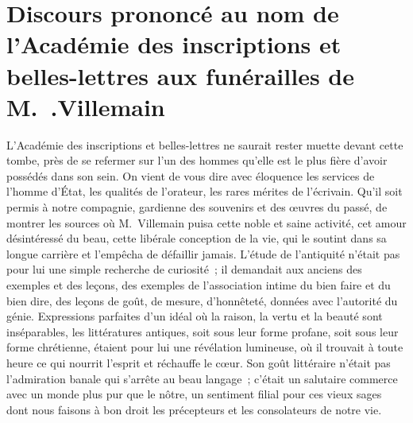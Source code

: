 \documentclass[french,twoside]{book} %
\newcommand\orgName[1]{#1}
\newcommand\persName[1]{#1}
\newcommand{\dateline}[1]{\medskip{\RaggedLeft{#1}\par}\bigskip}
\newcommand{\salute}[1]{\bigbreak{#1}\par\medbreak}
\begin{document}
\section[{Discours prononcé au nom de l’Académie des inscriptions et belles-lettres aux funérailles de M. .Villemain}]{Discours prononcé au nom de l’{\orgName Académie des inscriptions et belles-lettres} aux funérailles de {\persName M. .Villemain}}\renewcommand{\leftmark}{Discours prononcé au nom de l’{\orgName Académie des inscriptions et belles-lettres} aux funérailles de {\persName M. .Villemain}}


\dateline{10 mai 1870}

\salute{Messieurs,}
\noindent L’{\orgName Académie des inscriptions et belles-lettres} ne saurait rester muette devant cette tombe, près de se refermer sur l’un des hommes qu’elle est le plus fière d’avoir possédés dans son sein. On vient de vous dire avec éloquence les services de l’homme d’État, les qualités de l’orateur, les rares mérites de l’écrivain. Qu’il soit permis à notre compagnie, gardienne des souvenirs et des œuvres du passé, de montrer les sources où {\persName M. Villemain} puisa cette noble et saine activité, cet amour désintéressé du beau, cette libérale conception de la vie, qui le soutint dans sa longue carrière et l’empêcha de défaillir jamais. L’étude de l’antiquité n’était pas pour lui une simple recherche de curiosité ; il demandait aux anciens des exemples et des leçons, des exemples de l’association intime du bien faire et du bien dire, des leçons de goût, de mesure, d’honnêteté, données avec l’autorité du génie. Expressions parfaites d’un idéal où la raison, la vertu et la beauté sont inséparables, les littératures antiques, soit sous leur forme profane, soit sous leur forme chrétienne, étaient pour lui une révélation lumineuse, où il trouvait à toute heure ce qui nourrit l’esprit et réchauffe le cœur. Son goût littéraire n’était pas l’admiration banale qui s’arrête au beau langage ; c’était un salutaire commerce avec un monde plus pur que le nôtre, un sentiment filial pour ces vieux sages dont nous faisons à bon droit les précepteurs et les consolateurs de notre vie.\par
\end{document}

